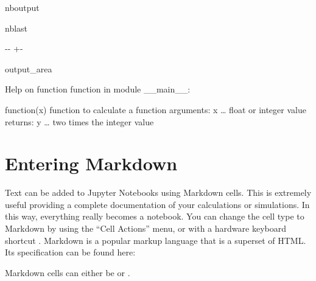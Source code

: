 \documentclass[letterpaper,10pt,english]{sphinxmanual}
\newlength\nbsphinxcodecellspacing
\begin{document}
\begin{sphinxuseclass}{nboutput}
\begin{sphinxuseclass}{nblast}
{

\kern-\sphinxverbatimsmallskipamount\kern-\baselineskip
\kern+\FrameHeightAdjust\kern-\fboxrule
\vspace{\nbsphinxcodecellspacing}

\begin{sphinxuseclass}{output_area}
\begin{sphinxuseclass}{}


\begin{sphinxVerbatim}[commandchars=\\\{\}]
Help on function function in module \_\_main\_\_:

function(x)
    function to calculate a function
    arguments:
        x {\ldots} float or integer value
    returns:
        y {\ldots} two times the integer value

\end{sphinxVerbatim}



\end{sphinxuseclass}
\end{sphinxuseclass}
}

\end{sphinxuseclass}
\end{sphinxuseclass}

\chapter{Entering Markdown}
\label{\detokenize{notebooks/Intro/EditCells:Entering-Markdown}}
\sphinxAtStartPar
Text can be added to Jupyter Notebooks using Markdown cells. This is extremely useful providing a complete documentation of your calculations or simulations. In this way, everything really becomes a notebook. You can change the cell type to Markdown by using the “Cell Actions” menu, or with a hardware keyboard shortcut . Markdown is a popular markup language that is a superset of HTML. Its specification can be found here:

\sphinxAtStartPar
{}

\sphinxAtStartPar
Markdown cells can either be  or .
\end{document}
